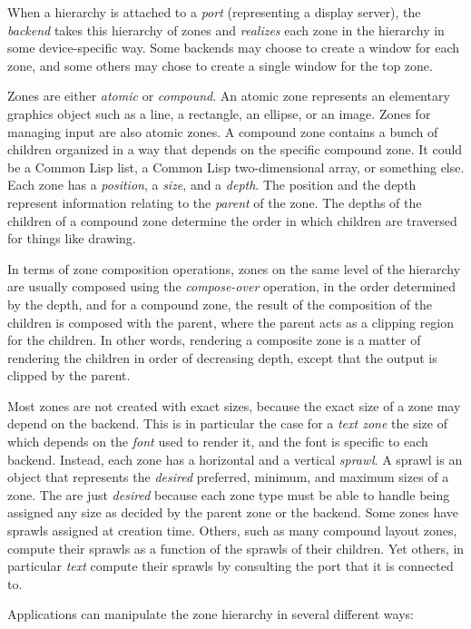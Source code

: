\documentclass{report}
\def\cl{Common Lisp}
\begin{document}
When a hierarchy is attached to a \emph{port} (representing a display
server), the \emph{backend} takes this hierarchy of zones and
\emph{realizes} each zone in the hierarchy in some device-specific
way.  Some backends may choose to create a window for each zone, and
some others may chose to create a single window for the top zone. 

Zones are either \emph{atomic} or \emph{compound}.  An atomic zone
represents an elementary graphics object such as a line, a rectangle,
an ellipse, or an image.  Zones for managing input are also atomic
zones.  A compound zone contains a bunch of children organized in a
way that depends on the specific compound zone.  It could be a \cl{}
list, a \cl{} two-dimensional array, or something else.  Each zone has
a \emph{position}, a \emph{size}, and a \emph{depth}.  The position
and the depth represent information relating to the \emph{parent} of
the zone.  The depths of the children of a compound zone determine the
order in which children are traversed for things like drawing.

In terms of zone composition operations, zones on the same level of
the hierarchy are usually composed using the \emph{compose-over}
operation, in the order determined by the depth, and for a compound
zone, the result of the composition of the children is composed with
the parent, where the parent acts as a clipping region for the
children.  In other words, rendering a composite zone is a matter of
rendering the children in order of decreasing depth, except that the
output is clipped by the parent. 

Most zones are not created with exact sizes, because the exact size of
a zone may depend on the backend.  This is in particular the case for
a \emph{text zone} the size of which depends on the \emph{font} used
to render it, and the font is specific to each backend.  Instead, each
zone has a horizontal and a vertical \emph{sprawl}.  A sprawl is an
object that represents the \emph{desired} preferred, minimum, and
maximum sizes of a zone.  The are just \emph{desired} because each
zone type must be able to handle being assigned any size as decided by
the parent zone or the backend.  Some zones have sprawls assigned at
creation time.  Others, such as many compound layout zones, compute
their sprawls as a function of the sprawls of their children.  Yet
others, in particular \emph{text} compute their sprawls by consulting
the port that it is connected to.

Applications can manipulate the zone hierarchy in several different
ways:  
\end{document}
